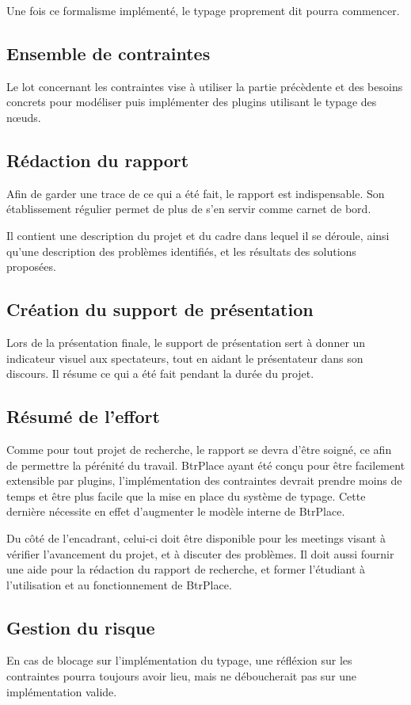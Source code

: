 \documentclass[a4paper]{article}
\begin{document}
Une fois ce formalisme implémenté, le typage proprement dit pourra commencer.
\subsection{  Ensemble de contraintes  }
Le lot concernant les contraintes vise à utiliser la partie précèdente et
des besoins concrets pour modéliser puis implémenter des plugins utilisant
le typage des nœuds.
\subsection{  Rédaction du rapport  }
Afin de garder une trace de ce qui a été fait, le rapport est indispensable.
Son établissement régulier permet de plus de s'en servir comme carnet de bord.

Il contient une description du projet et du cadre dans lequel il se déroule,
ainsi qu'une description des problèmes identifiés, et les résultats des
solutions proposées.

\subsection{  Création du support de présentation  }
Lors de la présentation finale, le support de présentation sert à donner
un indicateur visuel aux spectateurs, tout en aidant le présentateur dans
son discours. Il résume ce qui a été fait pendant la durée du projet.

\subsection{Résumé de l'effort}
Comme pour tout projet de recherche, le rapport se devra d'être soigné, ce afin
de permettre la pérénité du travail. BtrPlace ayant été conçu pour être
facilement extensible par plugins, l'implémentation des contraintes devrait
prendre moins de temps et être plus facile que la mise en place du système de
typage. Cette dernière nécessite en effet d'augmenter le modèle interne de
BtrPlace.

Du côté de l'encadrant, celui-ci doit être disponible pour les meetings
visant à vérifier l'avancement du projet, et à discuter des problèmes. Il
doit aussi fournir une aide pour la rédaction du rapport de recherche, et
former l'étudiant à l'utilisation et au fonctionnement de BtrPlace.

\subsection{Gestion du risque}
En cas de blocage sur l'implémentation du typage, une réfléxion sur
les contraintes pourra toujours avoir lieu, mais ne déboucherait pas
sur une implémentation valide.
\end{document}
